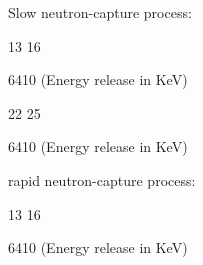 Slow neutron-capture process: \\	
\begin{center}
		
\end{center}
\vspace{-2mm}
\hspace{7.7cm} {\scriptsize 13 \hspace{0.7cm} 16 \hfill {} \\
	
	\vspace{-2mm}

	\hspace{7.6cm} 6410 \hfill (Energy release in KeV)}

\vspace{1cm}

\begin{center}
	
\end{center}
\vspace{-2mm}
\hspace{7.6cm} {\scriptsize 22 \hspace{0.9cm} 25 \hfill {} \\
	
	\vspace{-2mm}
	
	\hspace{7.6cm} 6410 \hfill (Energy release in KeV)}

\vspace{1cm}

rapid neutron-capture process: \\	
\begin{center}
	
\end{center}
\vspace{-2mm}
\hspace{7.7cm} {\scriptsize 13 \hspace{0.7cm} 16 \hfill {} \\
	
	\vspace{-2mm}
	
	\hspace{7.6cm} 6410 \hfill (Energy release in KeV)}

